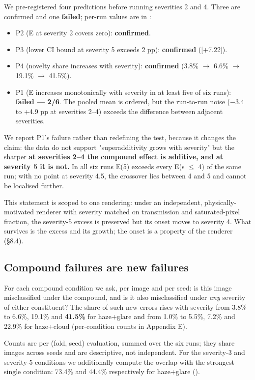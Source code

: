 We pre-registered four predictions before running severities 2 and 4. Three are confirmed and one \textbf{failed}; per-run values are in :

\begin{itemize}
\item P2 (E at severity 2 covers zero): \textbf{confirmed}.
\item P3 (lower CI bound at severity 5 exceeds 2 pp): \textbf{confirmed} ([+7.22]).
\item P4 (novelty share increases with severity): \textbf{confirmed} (3.8\% $\to$ 6.6\% $\to$ 19.1\% $\to$ 41.5\%).
\item P1 (E increases monotonically with severity in at least five of six runs): \textbf{failed --- 2/6}. The pooled mean is ordered, but the run-to-run noise ($-$3.4 to +4.9 pp at severities 2--4) exceeds the difference between adjacent severities.
\end{itemize}
We report P1's failure rather than redefining the test, because it changes the claim: the data do not support "superadditivity grows with severity" but the sharper \textbf{at severities 2--4 the compound effect is additive, and at severity 5 it is not.} In all six runs E(5) exceeds every E(s $\leq$ 4) of the same run; with no point at severity 4.5, the crossover lies between 4 and 5 and cannot be localised further.

This statement is scoped to one rendering: under an independent, physically-motivated renderer with severity matched on transmission and saturated-pixel fraction, the severity-5 excess is preserved but its onset moves to severity 4. What survives is the excess and its growth; the onset is a property of the renderer (§8.4).

\subsection{Compound failures are new failures}
For each compound condition we ask, per image and per seed: is this image misclassified under the compound, and is it also misclassified under \emph{any} severity of either constituent? The share of such new errors rises with severity from 3.8\% to 6.6\%, 19.1\% and \textbf{41.5\%} for haze+glare and from 1.0\% to 5.5\%, 7.2\% and 22.9\% for haze+cloud (per-condition counts in Appendix E).

Counts are per (fold, seed) evaluation, summed over the six runs; they share images across seeds and are descriptive, not independent. For the severity-3 and severity-5 conditions we additionally compute the overlap with the strongest single condition: 73.4\% and 44.4\% respectively for haze+glare ().

